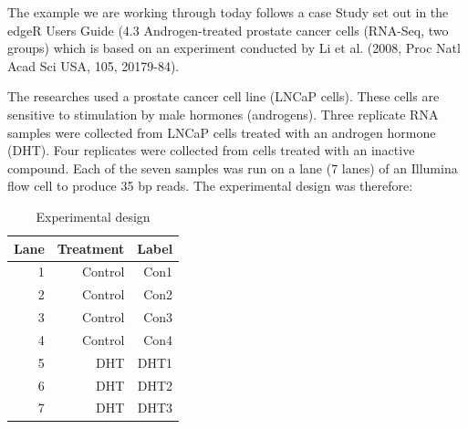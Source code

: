 \begin{information}
The example we are working through today follows a case Study set out in the edgeR Users
Guide (4.3 Androgen-treated prostate cancer cells (RNA-Seq, two groups) which is based on
an experiment conducted by Li et al. (2008, Proc Natl Acad Sci USA, 105, 20179-84).

The researches used a prostate cancer cell line (LNCaP cells). These cells are sensitive
to stimulation by male hormones (androgens). Three replicate RNA samples were collected
from LNCaP cells treated with an androgen hormone (DHT). Four replicates were collected
from cells treated with an inactive compound. Each of the seven samples was run on a
lane (7 lanes) of an Illumina flow cell to produce 35 bp reads. The experimental design
was therefore:

\begin{table}[H]
  \centering
  \caption{Experimental design}
    \begin{tabular}{rrr}
    \toprule
    \textbf{Lane} & \textbf{Treatment} & \textbf{Label} \\
    \midrule
    1    & Control & Con1 \\
    2    & Control & Con2 \\
    3    & Control & Con3 \\
    4    & Control & Con4 \\
    5    & DHT & DHT1 \\
    6    & DHT & DHT2 \\
    7    & DHT & DHT3 \\

    \bottomrule
    \end{tabular}
  \label{tab:experimental_design}
\end{table}
\end{information}

